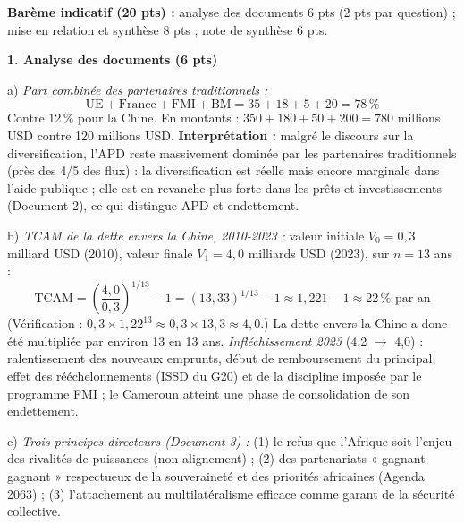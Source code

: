 \documentclass[11pt]{article}
\begin{document}
\begin{corrige}
\textbf{Barème indicatif (20 pts) :} analyse des documents 6 pts (2 pts par question) ; mise en relation et synthèse 8 pts ; note de synthèse 6 pts.

\textbf{1. Analyse des documents (6 pts)}

a) \emph{Part combinée des partenaires traditionnels :}
\[ \text{UE} + \text{France} + \text{FMI} + \text{BM} = 35 + 18 + 5 + 20 = 78\,\% \]
Contre $12\,\%$ pour la Chine. En montants : $350 + 180 + 50 + 200 = 780$ millions USD contre 120 millions USD. \textbf{Interprétation :} malgré le discours sur la diversification, l'APD reste massivement dominée par les partenaires traditionnels (près des 4/5 des flux) : la diversification est réelle mais encore marginale dans l'aide publique ; elle est en revanche plus forte dans les prêts et investissements (Document 2), ce qui distingue APD et endettement.

b) \emph{TCAM de la dette envers la Chine, 2010-2023 :} valeur initiale $V_0 = 0{,}3$ milliard USD (2010), valeur finale $V_1 = 4{,}0$ milliards USD (2023), sur $n = 13$ ans :
\[ \text{TCAM} = \left(\frac{4{,}0}{0{,}3}\right)^{1/13} - 1 = (13{,}33)^{1/13} - 1 \approx 1{,}221 - 1 \approx 22\,\% \text{ par an} \]
(Vérification : $0{,}3 \times 1{,}22^{13} \approx 0{,}3 \times 13{,}3 \approx 4{,}0$.) La dette envers la Chine a donc été multipliée par environ 13 en 13 ans. \emph{Infléchissement 2023} (4,2 $\rightarrow$ 4,0) : ralentissement des nouveaux emprunts, début de remboursement du principal, effet des rééchelonnements (ISSD du G20) et de la discipline imposée par le programme FMI ; le Cameroun atteint une phase de consolidation de son endettement.

c) \emph{Trois principes directeurs (Document 3) :} (1) le refus que l'Afrique soit l'enjeu des rivalités de puissances (non-alignement) ; (2) des partenariats « gagnant-gagnant » respectueux de la souveraineté et des priorités africaines (Agenda 2063) ; (3) l'attachement au multilatéralisme efficace comme garant de la sécurité collective.


\end{corrige}
\end{document}
